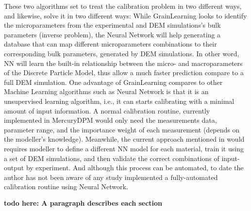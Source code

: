 
These two algorithms set to treat the calibration problem in two different ways, and likewise, solve it in two different ways: While GrainLearning looks to identify the microparameters from the experimental and DEM simulations's bulk parameters (inverse problem), the Neural Network will help generating a database that can map different microparameters combinations to their corresponding bulk parameters, generated by DEM simulations. In other word, NN will learn the built-in relationship between the micro- and macroparameters of the Discrete Particle Model, thus allow a much faster prediction compare to a full DEM simulation. 
One advantage of GrainLearning compares to other Machine Learning algorithms such as Neural Network is that it is an unsupervised learning algorithm, i.e., it can starts calibrating with a minimal amount of input information. A normal calibration routine, currently implemented in MercuryDPM would only need the measurements data, parameter range, and the importance weight of each measurement (depends on the modeller's knowledge). Meanwhile, the current approach mentioned in \cite{nn-calibration, NN-GA, NN-coarse} would requires modeller to define a different NN model for each material, train it using a set of DEM simulations, and then validate the correct combinations of input-output by experiment. And although this process can be automated, to date the author has not been aware of any study implemented a fully-automated calibration routine using Neural Network. 


 \textbf{todo here: A paragraph describes each section}


